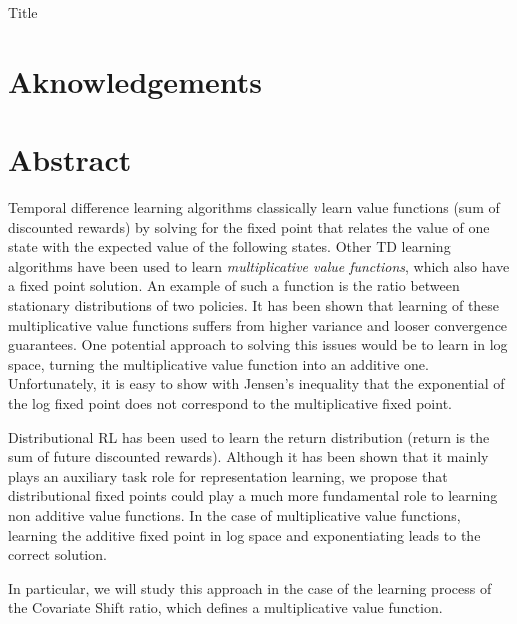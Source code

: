 \documentclass[12pt,a4paper,openright,twoside]{article}
\numberwithin{equation}{section}
\theoremstyle{definition}
\theoremstyle{remark}
\theoremstyle{plain}
\begin{document}
\thispagestyle{empty}

Title


\newpage
{} 

\newpage 


\section*{Aknowledgements}

\newpage


\section*{Abstract}

Temporal difference learning algorithms classically learn value functions (sum of discounted rewards) by solving for the fixed point that relates the value of one state with the expected value of the following states. Other TD learning algorithms have been used to learn \textit{multiplicative value functions}, which also have a fixed point solution. An example of such a function is the ratio between stationary distributions of two policies. It has been shown that learning of these multiplicative value functions suffers from higher variance and looser convergence guarantees. One potential approach to solving this issues would be to learn in log space, turning the multiplicative value function into an additive one. Unfortunately, it is easy to show with Jensen's inequality that the exponential of the log fixed point does not correspond to the multiplicative fixed point.

Distributional RL has been used to learn the return distribution (return is the sum of future discounted rewards). Although it has been shown that it mainly plays an auxiliary task role for representation learning, we propose that distributional fixed points could play a much more fundamental role to learning non additive value functions. In the case of multiplicative value functions, learning the additive fixed point in log space and exponentiating leads to the correct solution.

In particular, we will study this approach in the case of the learning process of the Covariate Shift ratio, which defines a multiplicative value function.





\newpage

\tableofcontents

\newpage
\end{document}
